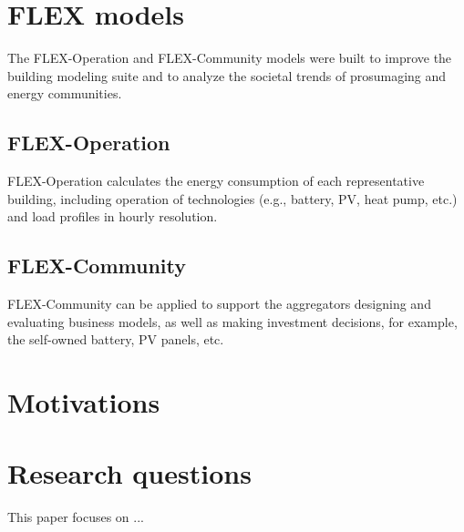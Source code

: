 \section{FLEX models}

The FLEX-Operation and FLEX-Community models were built to improve the building modeling suite and to analyze the societal trends of prosumaging and energy communities.

\subsection{FLEX-Operation}
FLEX-Operation calculates the energy consumption of each representative building, including operation of technologies (e.g., battery, PV, heat pump, etc.) and load profiles in hourly resolution.

\subsection{FLEX-Community}
FLEX-Community can be applied to support the aggregators designing and evaluating business models, as well as making investment decisions, for example, the self-owned battery, PV panels, etc.

\section{Motivations}
\section{Research questions}

This paper focuses on ... 

